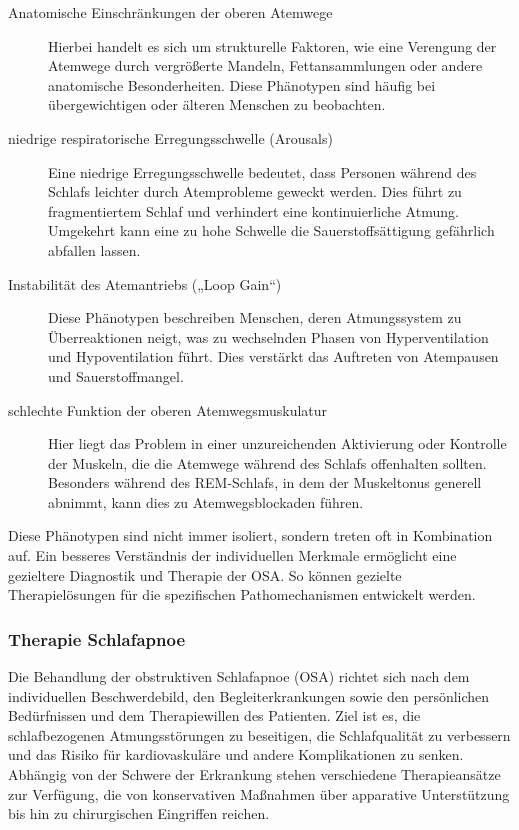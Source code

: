 \documentclass[a4paper, 12pt]{article}
\begin{document}
\begin{description}
	\item[Anatomische Einschränkungen der oberen Atemwege] Hierbei handelt es sich um strukturelle Faktoren, wie eine Verengung der Atemwege durch vergrößerte Mandeln, Fettansammlungen oder andere anatomische Besonderheiten. Diese Phänotypen sind häufig bei übergewichtigen oder älteren Menschen zu beobachten.

	\item[niedrige respiratorische Erregungsschwelle (Arousals)] Eine niedrige Erregungsschwelle bedeutet, dass Personen während des Schlafs leichter durch Atemprobleme geweckt werden. Dies führt zu fragmentiertem Schlaf und verhindert eine kontinuierliche Atmung. Umgekehrt kann eine zu hohe Schwelle die Sauerstoffsättigung gefährlich abfallen lassen.

	\item[Instabilität des Atemantriebs („Loop Gain“)] Diese Phänotypen beschreiben Menschen, deren Atmungssystem zu Überreaktionen neigt, was zu wechselnden Phasen von Hyperventilation und Hypoventilation führt. Dies verstärkt das Auftreten von Atempausen und Sauerstoffmangel.

	\item[schlechte Funktion der oberen Atemwegsmuskulatur] Hier liegt das Problem in einer unzureichenden Aktivierung oder Kontrolle der Muskeln, die die Atemwege während des Schlafs offenhalten sollten. Besonders während des REM-Schlafs, in dem der Muskeltonus generell abnimmt, kann dies zu Atemwegsblockaden führen.

\end{description}
Diese Phänotypen sind nicht immer isoliert, sondern treten oft in Kombination auf. Ein besseres Verständnis der individuellen Merkmale ermöglicht eine gezieltere Diagnostik und Therapie der OSA. So können gezielte Therapielösungen für die spezifischen Pathomechanismen entwickelt werden. 
\cite{OSA_Pathophysiology2019} \cite{DGSM2017}

\subsubsection{Therapie Schlafapnoe}\label{therapy}

Die Behandlung der obstruktiven Schlafapnoe (OSA) richtet sich nach dem individuellen Beschwerdebild, den Begleiterkrankungen sowie den persönlichen Bedürfnissen und dem Therapiewillen des Patienten. Ziel ist es, die schlafbezogenen Atmungsstörungen zu beseitigen, die Schlafqualität zu verbessern und das Risiko für kardiovaskuläre und andere Komplikationen zu senken. Abhängig von der Schwere der Erkrankung stehen verschiedene Therapieansätze zur Verfügung, die von konservativen Maßnahmen über apparative Unterstützung bis hin zu chirurgischen Eingriffen reichen. \cite{DAE81892} \cite{flexikon}
\end{document}

